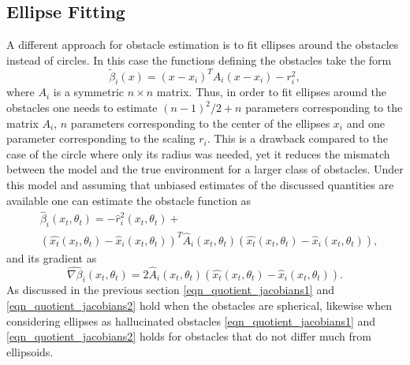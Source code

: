 \documentclass[article]{IEEEtran}
\theoremstyle{definition}
\begin{document}
\subsection{Ellipse Fitting}\label{sec_ellipse}
A different approach for obstacle estimation is to fit ellipses around the obstacles instead of circles. In this case the functions defining the obstacles take the form 
%
\begin{equation}
\tilde{\beta}_i(x) = \left(x-x_i\right)^TA_i(x-x_i) - r_i^2,
\end{equation}
%
where $A_i$ is a symmetric $n\times n$ matrix. Thus, in order to fit ellipses around the obstacles one needs to estimate $(n-1)^2/2+n$ parameters corresponding to the matrix $A_i$, $n$ parameters corresponding to the center of the ellipses $x_i$ and one parameter corresponding to the scaling $r_i$. This is a drawback compared to the case of the circle where only its radius was needed, yet it reduces the mismatch between the model and the true environment for a larger class of obstacles. Under this model and assuming that unbiased estimates of the discussed quantities are available one can estimate the obstacle function as
%
\begin{equation}
\begin{split}
&\hat{\beta}_i(x_t,\theta_t) = -\hat{r}_i^2(x_t,\theta_t)+ \\
& \left(\hat{x_t}(x_t,\theta_t)-\hat{x}_i(x_t,\theta_t)\right)^T\hat{A}_i(x_t,\theta_t)\left(\hat{x_t}(x_t,\theta_t)-\hat{x}_i(x_t,\theta_t)\right),
\end{split}
\end{equation}
%
and its gradient as 
%
\begin{equation}
\hat{\nabla \beta}_i(x_t,\theta_t) = 2\hat{A}_i(x_t,\theta_t)\left(\hat{x_t}(x_t,\theta_t)-\hat{x}_i(x_t,\theta_t)\right).
\end{equation}
%
As discussed in the previous section \eqref{eqn_quotient_jacobians1} and \eqref{eqn_quotient_jacobians2} hold when the obstacles are spherical, likewise when considering ellipses as hallucinated obstacles \eqref{eqn_quotient_jacobians1} and \eqref{eqn_quotient_jacobians2} holds for obstacles that do not differ much from ellipsoids. 
\end{document}
